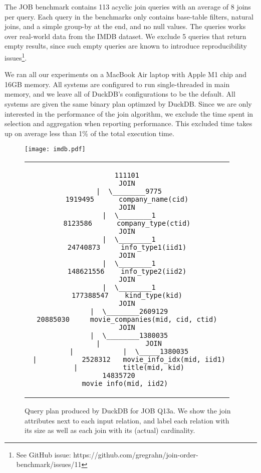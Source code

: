
The JOB benchmark contains 113 acyclic join queries with an average of 8 joins per query.
Each query in the benchmarks only contains base-table filters,
natural joins, and a simple group-by at the end,
and no null values.
The queries works over real-world data from the IMDB dataset.
We exclude 5 queries that return empty results,
since such empty queries are known to introduce reproducibility issues\footnote{
  See GitHub issue: https://github.com/gregrahn/join-order-benchmark/issues/11
}.

We ran all our experiments on a MacBook Air laptop with Apple M1 chip and 16GB memory.
All systems are configured to run single-threaded in main memory,
and we leave all of DuckDB's configurations to be the default.
All systems are given the same binary plan optimzed by DuckDB.
Since we are only interested in the performance of the join algorithm,
we exclude the time spent in selection and aggregation
when reporting performance.
This excluded time takes up on average less than 1\% of the total execution time.

\begin{figure}
  \centering
  \texttt{[image: imdb.pdf]}
  \label{fig:eval:imdb}
\end{figure}%

\begin{figure}
  \centering
  \begin{tabular}{c}
    \begin{lstlisting}[numbers=none]
111101
JOIN
 |  \________9775
1919495      company_name(cid)
JOIN
 |  \________1
8123586      company_type(ctid)
JOIN
 |  \________1
24740873     info_type1(iid1)
JOIN
 |  \________1
148621556    info_type2(iid2)
JOIN
 |  \________1
177388547    kind_type(kid)
JOIN
 |  \________2609129
20885030     movie_companies(mid, cid, ctid)
JOIN
 |  \________1380035
 |           JOIN
 |            |  \_____1380035
 |           2528312   movie_info_idx(mid, iid1)
 |           title(mid, kid)
14835720    
movie_info(mid, iid2) 
\end{lstlisting}
  \end{tabular}
  \caption{Query plan produced by DuckDB for JOB Q13a.
    We show the join attributes next to each input relation,
    and label each relation with its size as well as
    each join with its (actual) cardinality.  }
  \label{fig:eval:imdb:plan}
\end{figure}


